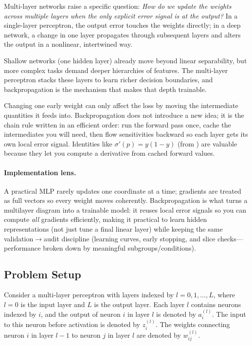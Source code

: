 Multi\hyp{}layer networks raise a specific question: \emph{How do we update the weights across multiple layers when the only explicit error signal is at the output?} In a single\hyp{}layer perceptron, the output error touches the weights directly; in a deep network, a change in one layer propagates through subsequent layers and alters the output in a nonlinear, intertwined way.

Shallow networks (one hidden layer) already move beyond linear separability, but more complex tasks demand deeper hierarchies of features. The multi\hyp{}layer perceptron stacks these layers to learn richer decision boundaries, and backpropagation is the mechanism that makes that depth trainable.

\begin{tcolorbox}[summarybox, title={Intuition: backprop as a controlled ripple effect}]
Changing one early weight can only affect the loss by moving the intermediate quantities it feeds into. Backpropagation does not introduce a new idea; it is the chain rule written in an efficient order: run the forward pass once, cache the intermediates you will need, then flow sensitivities backward so each layer gets its own local error signal. Identities like \(\sigma'(p)=y(1-y)\) (from ) are valuable because they let you compute a derivative from cached forward values.
\end{tcolorbox}

\paragraph{Implementation lens.}
A practical MLP rarely updates one coordinate at a time; gradients are treated as full vectors so every weight moves coherently. Backpropagation is what turns a multilayer diagram into a trainable model: it reuses local error signals so you can compute \emph{all} gradients efficiently, making it practical to learn hidden representations (not just tune a final linear layer) while keeping the same validation\(\rightarrow\)audit discipline (learning curves, early stopping, and slice checks---performance broken down by meaningful subgroups/conditions).

\subsection{Problem Setup}
\label{sec:backprop_problem_setup}

Consider a multi-layer perceptron with layers indexed by $l = 0, 1, \ldots, L$, where $l=0$ is the input layer and $L$ is the output layer. Each layer $l$ contains neurons indexed by $i$, and the output of neuron $i$ in layer $l$ is denoted by $a_i^{(l)}$. The input to this neuron before activation is denoted by $z_i^{(l)}$. The weights connecting neuron $i$ in layer $l-1$ to neuron $j$ in layer $l$ are denoted by $w_{ij}^{(l)}$.

